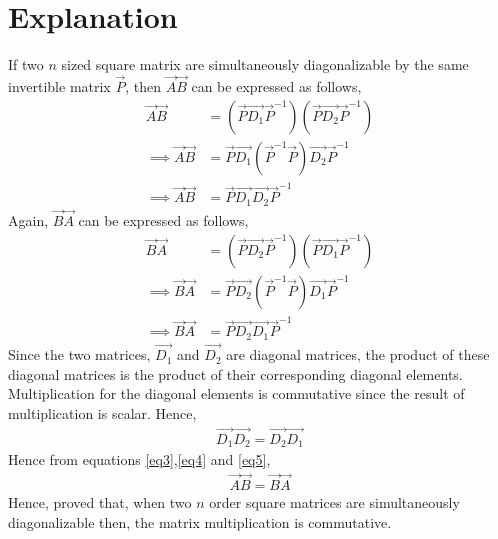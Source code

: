 \documentclass[journal,12pt,twocolumn]{IEEEtran}
\begin{document}
\section{Explanation}
If two $n$ sized square matrix are simultaneously diagonalizable by the same invertible matrix $\vec{P}$, then $\vec{A}\vec{B}$ can be expressed as follows,
\begin{align}
\vec{A}\vec{B} & = (\vec{P}\vec{D_1}\vec{P}^{-1})(\vec{P}\vec{D_2}\vec{P}^{-1})\\
\implies\vec{A}\vec{B}&=\vec{P}\vec{D_1}(\vec{P}^{-1}\vec{P})\vec{D_2}\vec{P}^{-1}\\
\implies\vec{A}\vec{B}&=\vec{P}\vec{D_1}\vec{D_2}\vec{P}^{-1}\label{eq3}
\end{align}
Again, $\vec{B}\vec{A}$ can be expressed as follows,
\begin{align}
\vec{B}\vec{A} & = (\vec{P}\vec{D_2}\vec{P}^{-1})(\vec{P}\vec{D_1}\vec{P}^{-1})\\
\implies\vec{B}\vec{A}&=\vec{P}\vec{D_2}(\vec{P}^{-1}\vec{P})\vec{D_1}\vec{P}^{-1}\\
\implies\vec{B}\vec{A}&=\vec{P}\vec{D_2}\vec{D_1}\vec{P}^{-1}\label{eq4}
\end{align}
Since the two matrices, $\vec{D_1}$ and $\vec{D_2}$ are diagonal matrices, the product of these diagonal matrices is the product of their corresponding diagonal elements. Multiplication for the diagonal elements is commutative since the result of multiplication is scalar. Hence,
\begin{align}
\vec{D_1}\vec{D_2} = \vec{D_2}\vec{D_1}\label{eq5}
\end{align}
Hence from equations \eqref{eq3},\eqref{eq4} and \eqref{eq5},
\begin{align}
\vec{A}\vec{B} = \vec{B}\vec{A}
\end{align}
Hence, proved that, when two $n$ order square matrices are simultaneously diagonalizable then, the matrix multiplication is commutative.
\end{document}
